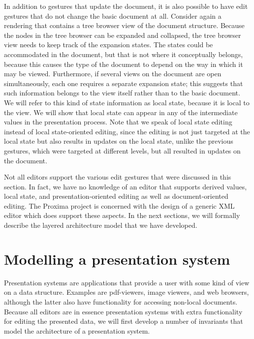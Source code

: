  In addition to gestures that update the document, it is also possible to have edit gestures that do not change the basic document at all. Consider again a rendering that contains a tree browser view of the document structure. Because the nodes in the tree browser can be expanded and collapsed, the tree browser view needs to keep track of the expansion states. The states could be accommodated in the document, but that is not where it conceptually belongs, because this causes the type of the document to depend on the way in which it may be viewed. Furthermore, if several views on the document are open simultaneously, each one requires a separate expansion state; this suggests that such information belongs to the view itself rather than to the basic document. We will refer to this kind of state information as local state, because it is local to the view. We will show that local state can appear in any of the intermediate values in the presentation process. Note that we speak of local state editing instead of local state-oriented editing, since the editing is not just targeted at the local state but also results in updates on the local state, unlike the previous gestures, which were targeted at different levels, but all resulted in updates on the document.

Not all editors support the various edit gestures that were discussed in this section. In fact, we have no knowledge of an editor that supports derived values, local state, and presentation-oriented editing as well as document-oriented editing.  The Proxima project is concerned with the design of a generic XML editor which does support these aspects. In the next sections, we will formally describe the layered architecture model that we have developed.
\section{Modelling a presentation system}
\label{presenting}



Presentation systems are applications that provide a user with some kind of view on a data structure. Examples are pdf-viewers, image viewers, and web browsers, although the latter also have functionality for accessing non-local documents. Because all editors are in essence presentation systems with extra functionality for editing the presented data, we will first develop a number of invariants that model the architecture of a presentation system.

